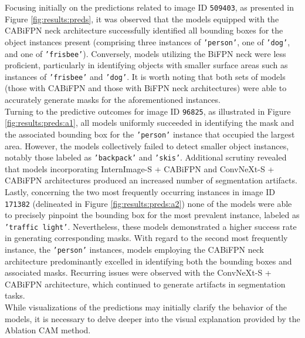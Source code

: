 Focusing initially on the predictions related to image ID \texttt{509403}, as presented in Figure \ref{fig:results:preds}, it was observed that the models equipped with the CABiFPN neck architecture successfully identified all bounding boxes for the object instances present (comprising three instances of \texttt{'person'}, one of \texttt{'dog'}, and one of \texttt{'frisbee'}). Conversely, models utilizing the BiFPN neck were less proficient, particularly in identifying objects with smaller surface areas such as instances of \texttt{'frisbee'} and \texttt{'dog'}. It is worth noting that both sets of models (those with CABiFPN and those with BiFPN neck architectures) were able to accurately generate masks for the aforementioned instances.\\

Turning to the predictive outcomes for image ID \texttt{96825}, as illustrated in Figure \ref{fig:results:preds:a1}, all models uniformly succeeded in identifying the mask and the associated bounding box for the \texttt{'person'} instance that occupied the largest area. However, the models collectively failed to detect smaller object instances, notably those labeled as \texttt{'backpack'} and \texttt{'skis'}. Additional scrutiny revealed that models incorporating InternImage-S + CABiFPN and ConvNeXt-S + CABiFPN architectures produced an increased number of segmentation artifacts.\\

Lastly, concerning the two most frequently occurring instances in image ID \texttt{171382} (delineated in Figure \ref{fig:results:preds:a2}) none of the models were able to precisely pinpoint the bounding box for the most prevalent instance, labeled as \texttt{'traffic light'}. Nevertheless, these models demonstrated a higher success rate in generating corresponding masks. With regard to the second most frequently instance, the \texttt{'person'} instances, models employing the CABiFPN neck architecture predominantly excelled in identifying both the bounding boxes and associated masks. Recurring issues were observed with the ConvNeXt-S + CABiFPN architecture, which continued to generate artifacts in segmentation tasks.\\

While visualizations of the predictions may initially clarify the behavior of the models, it is necessary to delve deeper into the visual explanation provided by the Ablation CAM method.

